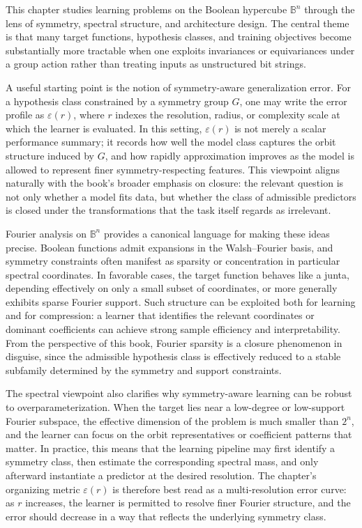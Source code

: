 This chapter studies learning problems on the Boolean hypercube \(\mathbb{B}^n\) through the lens of symmetry, spectral structure, and architecture design. The central theme is that many target functions, hypothesis classes, and training objectives become substantially more tractable when one exploits invariances or equivariances under a group action rather than treating inputs as unstructured bit strings.

A useful starting point is the notion of symmetry-aware generalization error. For a hypothesis class constrained by a symmetry group \(G\), one may write the error profile as \(\varepsilon(r)\), where \(r\) indexes the resolution, radius, or complexity scale at which the learner is evaluated. In this setting, \(\varepsilon(r)\) is not merely a scalar performance summary; it records how well the model class captures the orbit structure induced by \(G\), and how rapidly approximation improves as the model is allowed to represent finer symmetry-respecting features. This viewpoint aligns naturally with the book's broader emphasis on closure: the relevant question is not only whether a model fits data, but whether the class of admissible predictors is closed under the transformations that the task itself regards as irrelevant.

Fourier analysis on \(\mathbb{B}^n\) provides a canonical language for making these ideas precise. Boolean functions admit expansions in the Walsh--Fourier basis, and symmetry constraints often manifest as sparsity or concentration in particular spectral coordinates. In favorable cases, the target function behaves like a junta, depending effectively on only a small subset of coordinates, or more generally exhibits sparse Fourier support. Such structure can be exploited both for learning and for compression: a learner that identifies the relevant coordinates or dominant coefficients can achieve strong sample efficiency and interpretability. From the perspective of this book, Fourier sparsity is a closure phenomenon in disguise, since the admissible hypothesis class is effectively reduced to a stable subfamily determined by the symmetry and support constraints.

The spectral viewpoint also clarifies why symmetry-aware learning can be robust to overparameterization. When the target lies near a low-degree or low-support Fourier subspace, the effective dimension of the problem is much smaller than \(2^n\), and the learner can focus on the orbit representatives or coefficient patterns that matter. In practice, this means that the learning pipeline may first identify a symmetry class, then estimate the corresponding spectral mass, and only afterward instantiate a predictor at the desired resolution. The chapter's organizing metric \(\varepsilon(r)\) is therefore best read as a multi-resolution error curve: as \(r\) increases, the learner is permitted to resolve finer Fourier structure, and the error should decrease in a way that reflects the underlying symmetry class.

